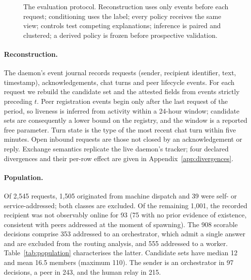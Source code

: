 \documentclass[11pt]{article}
\theoremstyle{definition}
\begin{document}
\begin{figure}[t]
\caption{The evaluation protocol. Reconstruction uses only events before each request; conditioning uses the label; every policy receives the same view; controls test competing explanations; inference is paired and clustered; a derived policy is frozen before prospective validation.}
\label{fig:pipeline}
\end{figure}

\paragraph{Reconstruction.}
The daemon's event journal records requests (sender, recipient identifier, text, timestamp), acknowledgements, chat turns and peer lifecycle events. For each request we rebuild the candidate set and the attested fields from events strictly preceding $t$. Peer registration events begin only after the last request of the period, so liveness is inferred from activity within a 24-hour window; candidate sets are consequently a lower bound on the registry, and the window is a reported free parameter. Turn state is the type of the most recent chat turn within five minutes. Open inbound requests are those not closed by an acknowledgement or reply. Exchange semantics replicate the live daemon's tracker; four declared divergences and their per-row effect are given in Appendix~\ref{app:divergences}.

\paragraph{Population.}
Of 2,545 requests, 1,505 originated from machine dispatch and 39 were self- or service-addressed; both classes are excluded. Of the remaining 1,001, the recorded recipient was not observably online for 93 (75 with no prior evidence of existence, consistent with peers addressed at the moment of spawning). The 908 scorable decisions comprise 353 addressed to an orchestrator, which admit a single answer and are excluded from the routing analysis, and 555 addressed to a worker. Table~\ref{tab:population} characterises the latter. Candidate sets have median 12 and mean 16.5 members (maximum 110). The sender is an orchestrator in 97 decisions, a peer in 243, and the human relay in 215.
\end{document}
